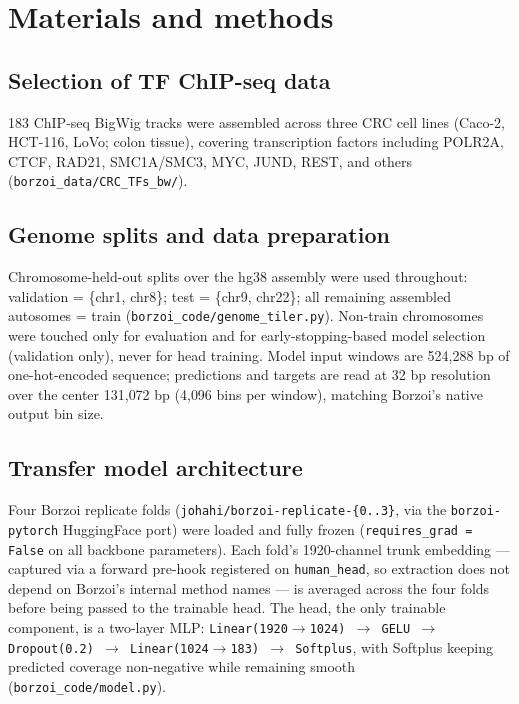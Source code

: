 \documentclass[10pt]{article}
\begin{document}
\section*{Materials and methods}

\subsection*{Selection of TF ChIP-seq data}
183 ChIP-seq BigWig tracks were assembled across three CRC cell lines (Caco-2, HCT-116, LoVo; colon tissue), covering transcription factors including POLR2A, CTCF, RAD21, SMC1A/SMC3, MYC, JUND, REST, and others (\texttt{borzoi\_data/CRC\_TFs\_bw/}).

\subsection*{Genome splits and data preparation}
Chromosome-held-out splits over the hg38 assembly were used throughout: validation = \{chr1, chr8\}; test = \{chr9, chr22\}; all remaining assembled autosomes = train (\texttt{borzoi\_code/genome\_tiler.py}). Non-train chromosomes were touched only for evaluation and for early-stopping-based model selection (validation only), never for head training. Model input windows are 524{,}288 bp of one-hot-encoded sequence; predictions and targets are read at 32 bp resolution over the center 131{,}072 bp (4{,}096 bins per window), matching Borzoi's native output bin size.

\subsection*{Transfer model architecture}
Four Borzoi replicate folds (\texttt{johahi/borzoi-replicate-\{0..3\}}, via the \texttt{borzoi-pytorch} HuggingFace port) were loaded and fully frozen (\texttt{requires\_grad = False} on all backbone parameters). Each fold's 1920-channel trunk embedding --- captured via a forward pre-hook registered on \texttt{human\_head}, so extraction does not depend on Borzoi's internal method names --- is averaged across the four folds before being passed to the trainable head. The head, the only trainable component, is a two-layer MLP: \texttt{Linear(1920$\to$1024) $\to$ GELU $\to$ Dropout(0.2) $\to$ Linear(1024$\to$183) $\to$ Softplus}, with Softplus keeping predicted coverage non-negative while remaining smooth (\texttt{borzoi\_code/model.py}).
\end{document}
